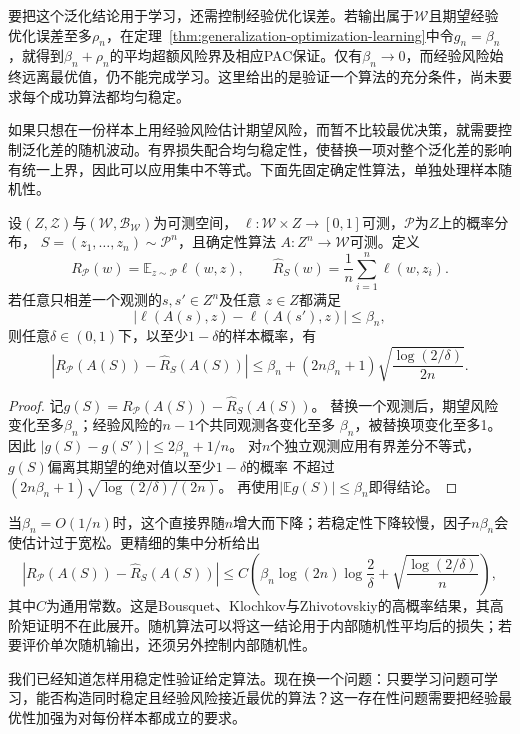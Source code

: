 要把这个泛化结论用于学习，还需控制经验优化误差。若输出属于$\mathcal W$且期望经验优化误差至多$\rho_n$，在定理~\ref{thm:generalization-optimization-learning}中令$g_n=\beta_n$，就得到$\beta_n+\rho_n$的平均超额风险界及相应PAC保证。仅有$\beta_n\to0$，而经验风险始终远离最优值，仍不能完成学习。这里给出的是验证一个算法的充分条件，尚未要求每个成功算法都均匀稳定。

如果只想在一份样本上用经验风险估计期望风险，而暂不比较最优决策，就需要控制泛化差的随机波动。有界损失配合均匀稳定性，使替换一项对整个泛化差的影响有统一上界，因此可以应用集中不等式。下面先固定确定性算法，单独处理样本随机性。

\begin{theorem}[均匀稳定性的高概率泛化界]
\label{thm:stability-high-probability}
设$(Z,\mathcal Z)$与$(\mathcal W,\mathcal B_{\mathcal W})$为可测空间，
$\ell:\mathcal W\times Z\to[0,1]$可测，$\mathcal P$为$Z$上的概率分布，
$S=(z_1,\ldots,z_n)\sim\mathcal P^n$，且确定性算法
$A:Z^n\to\mathcal W$可测。定义
\[
 R_{\mathcal P}(w)=\mathbb E_{z\sim\mathcal P}\ell(w,z),
 \qquad
 \hat R_S(w)=\frac1n\sum_{i=1}^n\ell(w,z_i).
\]
若任意只相差一个观测的$s,s'\in Z^n$及任意
$z\in Z$都满足
\[
 |\ell(A(s),z)-\ell(A(s'),z)|\leq\beta_n,
\]
则任意$\delta\in(0,1)$下，以至少$1-\delta$的样本概率，有
\[
 |R_{\mathcal P}(A(S))-\hat R_S(A(S))|
 \leq\beta_n+(2n\beta_n+1)\sqrt{\frac{\log(2/\delta)}{2n}}.
\]
\end{theorem}
\begin{proof}
记$g(S)=R_{\mathcal P}(A(S))-\hat R_S(A(S))$。
替换一个观测后，期望风险变化至多$\beta_n$；经验风险的$n-1$个共同观测各变化至多
$\beta_n$，被替换项变化至多1。因此
$|g(S)-g(S')|\leq2\beta_n+1/n$。
对$n$个独立观测应用有界差分不等式，$g(S)$偏离其期望的绝对值以至少$1-\delta$的概率
不超过$(2n\beta_n+1)\sqrt{\log(2/\delta)/(2n)}$。
再使用$|\mathbb E g(S)|\leq\beta_n$即得结论。
\end{proof}

当$\beta_n=O(1/n)$时，这个直接界随$n$增大而下降；若稳定性下降较慢，因子$n\beta_n$会使估计过于宽松。更精细的集中分析给出
\[
 |R_{\mathcal P}(A(S))-\hat R_S(A(S))|
 \leq C\!\left(\beta_n\log(2n)\log\frac2\delta
          +\sqrt{\frac{\log(2/\delta)}n}\right),
\]
其中$C$为通用常数。这是Bousquet、Klochkov与Zhivotovskiy的高概率结果，其高阶矩证明不在此展开。随机算法可以将这一结论用于内部随机性平均后的损失；若要评价单次随机输出，还须另外控制内部随机性。

我们已经知道怎样用稳定性验证给定算法。现在换一个问题：只要学习问题可学习，能否构造同时稳定且经验风险接近最优的算法？这一存在性问题需要把经验最优性加强为对每份样本都成立的要求。

